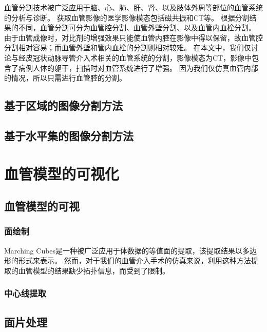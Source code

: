 血管分割技术被广泛应用于脑、心、肺、肝、肾、以及肢体外周等部位的血管系统的分析与诊断。
获取血管影像的医学影像模态包括磁共振和CT等。
根据分割结果的不同，血管分割可分为血管腔分割、血管外壁分割、以及血管内血栓分割\cite{Lesage2009Review}。
由于血管成像时，对比剂的增强效果只能使血管内腔在影像中得以保留，故血管腔分割相对容易；而血管外壁和管内血栓的分割则相对较难。
在本文中，我们仅讨论与经皮冠状动脉导管介入术相关的血管系统的分割，影像模态为CT，影像中包含了病例人体的躯干，扫描时对血管系统进行了增强。
因为我们仅仿真血管内部的情况，所以只需进行血管腔的分割。

\subsection{基于区域的图像分割方法}

\subsection{基于水平集的图像分割方法}

\cite{Sethian1996FastMarching} \cite{Osher1988LevelSet}


\section{血管模型的可视化}

\subsection{血管模型的可视}

\subsubsection{面绘制}

Marching Cubes\cite{Lorensen1987MC}是一种被广泛应用于体数据的等值面的提取，该提取结果以多边形的形式来表示。
然而，对于我们的血管介入手术的仿真来说，利用这种方法提取的血管模型的结果缺少拓扑信息，而受到了限制\cite{Nowinski2001NeuroCath}\cite{Hahn1998GWU}。

\subsubsection{中心线提取}

\subsection{面片处理}

